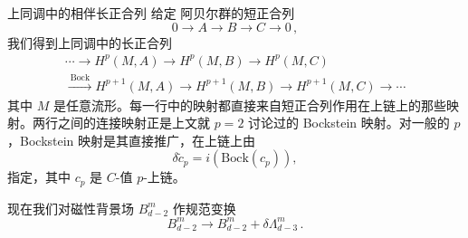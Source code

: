
\begin{notebox}{上同调中的相伴长正合列}
给定 阿贝尔群的短正合列
\begin{equation}
0\to A\to B\to C\to 0\,,
\tag{4.108}
\end{equation}
我们得到上同调中的长正合列
\begin{equation}
\begin{gathered}
\cdots \longrightarrow H^p(M,A)\longrightarrow H^p(M,B)\longrightarrow H^p(M,C)\\
\xrightarrow{\ \mathrm{Bock}\ } H^{p+1}(M,A)\longrightarrow H^{p+1}(M,B)\longrightarrow H^{p+1}(M,C)\longrightarrow \cdots
\end{gathered}
\tag{4.109}
\end{equation}
其中 $M$ 是任意流形。每一行中的映射都直接来自短正合列作用在上链上的那些映射。两行之间的连接映射正是上文就 $p=2$ 讨论过的 Bockstein 映射。对一般的 $p$，Bockstein 映射是其直接推广，在上链上由
\begin{equation}
\delta\tilde{c}_p=i\left(\mathrm{Bock}(c_p)\right),
\tag{4.110}
\end{equation}
指定，其中 $c_p$ 是 $C$-值 $p$-上链。
\end{notebox}


现在我们对磁性背景场 $B^m_{d-2}$ 作规范变换
\begin{equation}
B^m_{d-2}\to B^m_{d-2}+\delta\Lambda^m_{d-3}\,.
\tag{4.111}
\end{equation}
